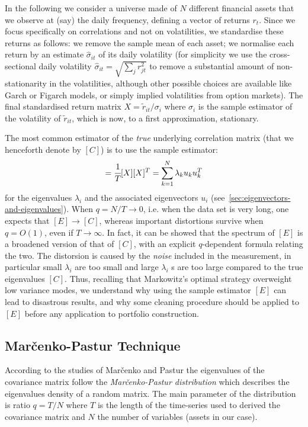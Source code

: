 In the following we consider a universe made of $N$ different financial assets that we observe at (say) the daily frequency, defining a vector of returns $r_t$. Since we focus specifically on correlations and not on volatilities, we standardise these returns as follows: we remove the sample mean of each asset; we normalise each return by an estimate $\hat{\sigma}_{it}$ of its daily volatility (for simplicity we use the cross-sectional daily volatility $\hat{\sigma}_{it}=\sqrt{\sum_j r_{jt}^2}$ to remove a substantial amount of non-stationarity in the volatilities, although other possible choices are available like Garch or Figarch models, or simply implied volatilities from option markets). The final standardised return matrix $X = \tilde{r}_{it}/\sigma_i$ where $\sigma_i$ is the sample estimator of the volatility of $\tilde{r}_{it}$, which is now, to a first approximation, stationary.

The most common estimator of the \emph{true} underlying correlation matrix (that we henceforth denote by $[C]$) is to use the sample estimator:
\begin{equation}
[E] = \cfrac{1}{T}[X][X]^{T} = \sum_{k=1}^{N} \lambda_k u_k u_k^{T}
\end{equation}
for the eigenvalues $\lambda_i$ and the associated eigenvectors $u_i$ (see~\ref{sec:eigenvectors-and-eigenvalues}). When $q=N/T\rightarrow 0$, i.e. when the data set is very long, one expects that $[E]\rightarrow [C]$, whereas important distortions survive when $q=O(1)$, even if $T\rightarrow \infty$. In fact, it can be showed that the spectrum of $[E]$ is a broadened version of that of $[C]$, with an explicit $q$-dependent formula relating the two. The distorsion is caused by the \emph{noise} included in the measurement, in particular small $\lambda_i$ are too small and large $\lambda_i$ s are too large compared to the true eigenvalues $[C]$. Thus, recalling that Markowitz’s optimal strategy overweight low variance modes, we understand why using the sample estimator $[E]$ can lead to disastrous results, and why some cleaning procedure should be applied to $[E]$ before any application to portfolio construction.

\subsection{Mar\v{c}enko-Pastur Technique}
According to the studies of Mar\v{c}enko and Pastur the eigenvalues of the covariance matrix follow the \emph{Mar\v{c}enko-Pastur distribution} which describes the eigenvalues density of a random matrix. The main parameter of the distribution is ratio $q=T/N$ where $T$ is the length of the time-series used to derived the covariance matrix and $N$ the number of variables (assets in our case).

